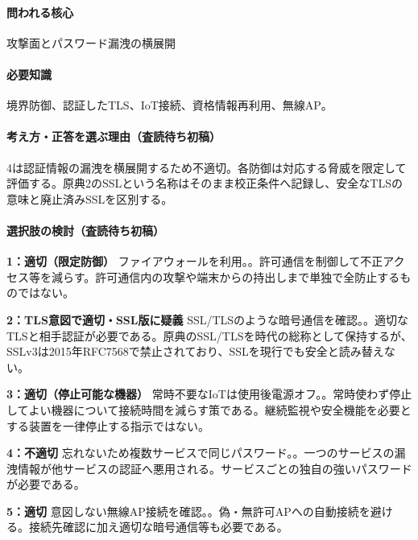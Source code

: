 \paragraph{問われる核心} 攻撃面とパスワード漏洩の横展開

\paragraph{必要知識} 境界防御、認証したTLS、IoT接続、資格情報再利用、無線AP。

\paragraph{考え方・正答を選ぶ理由（査読待ち初稿）} 4は認証情報の漏洩を横展開するため不適切。各防御は対応する脅威を限定して評価する。原典2のSSLという名称はそのまま校正条件へ記録し、安全なTLSの意味と廃止済みSSLを区別する。

\paragraph{選択肢の検討（査読待ち初稿）}\mbox{}\par

\noindent\textbf{1：適切（限定防御）} ファイアウォールを利用。。許可通信を制御して不正アクセス等を減らす。許可通信内の攻撃や端末からの持出しまで単独で全防止するものではない。\par

\noindent\textbf{2：TLS意図で適切・SSL版に疑義} SSL/TLSのような暗号通信を確認。。適切なTLSと相手認証が必要である。原典のSSL/TLSを時代の総称として保持するが、SSLv3は2015年RFC7568で禁止されており、SSLを現行でも安全と読み替えない。\par

\noindent\textbf{3：適切（停止可能な機器）} 常時不要なIoTは使用後電源オフ。。常時使わず停止してよい機器について接続時間を減らす策である。継続監視や安全機能を必要とする装置を一律停止する指示ではない。\par

\noindent\textbf{4：不適切} 忘れないため複数サービスで同じパスワード。。一つのサービスの漏洩情報が他サービスの認証へ悪用される。サービスごとの独自の強いパスワードが必要である。\par

\noindent\textbf{5：適切} 意図しない無線AP接続を確認。。偽・無許可APへの自動接続を避ける。接続先確認に加え適切な暗号通信等も必要である。\par

